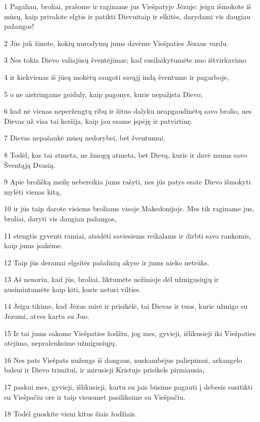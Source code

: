 \par 1 Pagaliau, broliai, prašome ir raginame jus Viešpatyje Jėzuje: jeigu išmokote iš mūsų, kaip privalote elgtis ir patikti Dievui­taip ir elkitės, darydami vis daugiau pažangos! 
\par 2 Jūs juk žinote, kokių nurodymų jums davėme Viešpaties Jėzaus vardu. 
\par 3 Nes tokia Dievo valia­jūsų šventėjimas; kad susilaikytumėte nuo ištvirkavimo 
\par 4 ir kiekvienas iš jūsų mokėtų saugoti savąjį indą šventume ir pagarboje, 
\par 5 o ne aistringame geiduly, kaip pagonys, kurie nepažįsta Dievo; 
\par 6 kad nė vienas neperžengtų ribų ir šituo dalyku neapgaudinėtų savo brolio, nes Dievas už visa tai keršija, kaip jau esame įspėję ir patvirtinę. 
\par 7 Dievas nepašaukė mūsų nedorybei, bet šventumui. 
\par 8 Todėl, kas tai atmeta, ne žmogų atmeta, bet Dievą, kuris ir davė mums savo Šventąją Dvasią. 
\par 9 Apie brolišką meilę nebereikia jums rašyti, nes jūs patys esate Dievo išmokyti mylėti vienas kitą, 
\par 10 ir jūs taip darote visiems broliams visoje Makedonijoje. Mes tik raginame jus, broliai, daryti vis daugiau pažangos, 
\par 11 stengtis gyventi ramiai, atsidėti saviesiems reikalams ir dirbti savo rankomis, kaip jums įsakėme. 
\par 12 Taip jūs deramai elgsitės pašalinių akyse ir jums nieko netrūks. 
\par 13 Aš nenoriu, kad jūs, broliai, liktumėte nežinioje dėl užmigusiųjų ir nusimintumėte kaip kiti, kurie neturi vilties. 
\par 14 Jeigu tikime, kad Jėzus mirė ir prisikėlė, tai Dievas ir tuos, kurie užmigo su Jėzumi, atves kartu su Juo. 
\par 15 Ir tai jums sakome Viešpaties žodžiu, jog mes, gyvieji, išlikusieji iki Viešpaties atėjimo, nepralenksime užmigusiųjų. 
\par 16 Nes pats Viešpats nužengs iš dangaus, nuskambėjus paliepimui, arkangelo balsui ir Dievo trimitui, ir mirusieji Kristuje prisikels pirmiausia, 
\par 17 paskui mes, gyvieji, išlikusieji, kartu su jais būsime pagauti į debesis susitikti su Viešpačiu ore ir taip visuomet pasiliksime su Viešpačiu. 
\par 18 Todėl guoskite vieni kitus šiais žodžiais.



